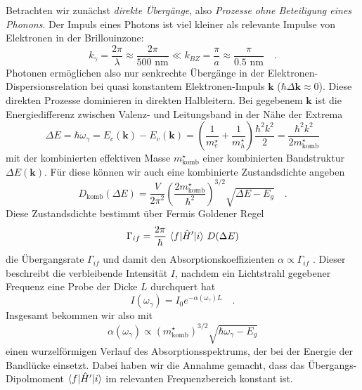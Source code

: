 Betrachten wir zunächst \emph{direkte Übergänge}, also \emph{Prozesse ohne Beteiligung eines Phonons}. Der Impuls eines Photons ist viel kleiner als relevante Impulse von Elektronen in der Brillouinzone:
\begin{equation}
    k_\gamma = \frac{2 \pi }{\lambda} \approx \frac{2 \pi }{500\text{ nm}}
    \ll k_{BZ} = \frac{\pi}{a} \approx \frac{\pi}{0.5 \text{ nm}} \quad .
\end{equation}
Photonen ermöglichen also nur senkrechte Übergänge in der Elektronen-Dispersionsrelation bei quasi konstantem Elektronen-Impuls $\mathbf{k}$ ($\hbar \Delta \mathbf{k} \approx 0$). Diese direkten Prozesse dominieren in direkten Halbleitern. Bei gegebenem $\mathbf{k}$ ist die Energiedifferenz zwischen Valenz- und Leitungsband in der Nähe der Extrema
\begin{equation}
    \Delta E = \hbar \omega_\gamma = E_c(\mathbf{k})-  E_v(\mathbf{k}) = 
    \left( \frac{1}{m_e^\star} + \frac{1}{m_h^\star} \right) \frac{\hbar^2 k^2}{2} =  \frac{\hbar^2 k^2}{2 m^\star_\text{komb}}
\end{equation}
mit der kombinierten effektiven Masse $m^\star_\text{komb}$ einer kombinierten Bandstruktur $ \Delta E(\mathbf{k})$. Für diese können wir auch eine kombinierte Zustandsdichte angeben
\begin{equation}
    D_\text{komb}( \Delta E) = \frac{V}{2 \pi^2} \left( \frac{2 m^\star_\text{komb}}{\hbar^2} \right)^{3/2} \sqrt{\Delta E - E_g} \quad .
\end{equation}
Diese Zustandsdichte bestimmt über  Fermis  Goldener Regel
\begin{equation}
            \Gamma_{if} = \frac{2 \pi}{\hbar} \, \braket{f | \hat{H}' | i} \, D( \Delta E)
\end{equation}
 die Übergangsrate $\Gamma_{if}$ und damit den Absorptionskoeffizienten $\alpha \propto \Gamma_{if}$ . Dieser beschreibt die verbleibende Intensität $I$, nachdem ein Lichtstrahl gegebener Frequenz eine Probe der Dicke $L$ durchquert hat
\begin{equation}
    I(\omega_\gamma) = I_0 e^{- \alpha(\omega_\gamma) L} \quad .
\end{equation}
Insgesamt bekommen wir also mit
\begin{equation}
    \alpha(\omega_\gamma) \propto ( m^\star_\text{komb})^{3/2}  \sqrt{\hbar \omega_\gamma - E_g} \label{eq:5_absorption_direct_HL}
\end{equation}
einen wurzelförmigen Verlauf des Absorptionsspektrums, der bei der Energie der Bandlücke einsetzt. Dabei haben wir die Annahme gemacht, dass  das Übergangs-Dipolmoment $\braket{f | \hat{H}' | i} $  im relevanten Frequenzbereich konstant ist.

